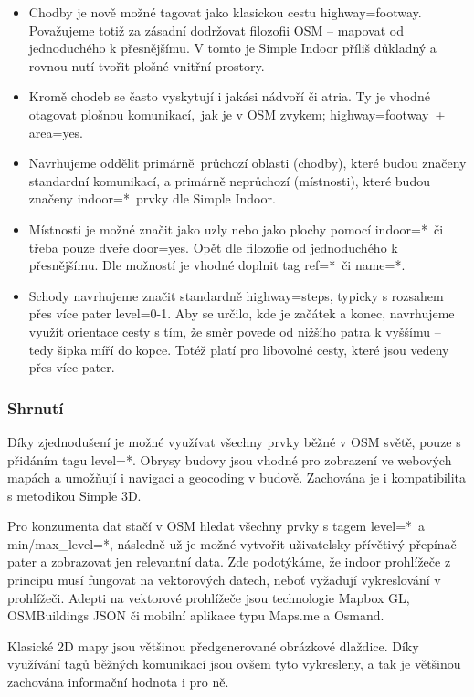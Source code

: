 \begin{itemize}
\tightlist
\item
  Chodby je nově možné tagovat jako klasickou cestu highway=footway. Považujeme totiž za zásadní dodržovat filozofii OSM -- mapovat od jednoduchého k přesnějšímu. V tomto je Simple Indoor příliš důkladný a rovnou nutí tvořit plošné vnitřní prostory.
\item
  Kromě chodeb se často vyskytují i jakási nádvoří či atria. Ty je vhodné otagovat plošnou komunikací,~jak je v OSM zvykem; highway=footway~+ area=yes.
\item
  Navrhujeme oddělit primárně~průchozí oblasti (chodby), které budou značeny standardní komunikací, a primárně neprůchozí (místnosti), které budou značeny indoor=*~prvky dle Simple Indoor.
\item
  Místnosti je možné značit jako uzly nebo jako plochy pomocí indoor=*~či třeba pouze dveře door=yes. Opět dle filozofie od jednoduchého k přesnějšímu. Dle možností je vhodné doplnit tag ref=*~či name=*.
\item
  Schody navrhujeme značit standardně highway=steps, typicky s rozsahem přes více pater level=0-1. Aby se určilo, kde je začátek a konec, navrhujeme využít orientace cesty s tím, že směr povede od nižšího patra k vyššímu -- tedy šipka míří do kopce. Totéž platí pro libovolné cesty, které jsou vedeny přes více pater.
\end{itemize}

\subsubsection{Shrnutí}\label{shrnutuxed}

Díky zjednodušení je možné využívat všechny prvky běžné v OSM světě, pouze s přidáním tagu level=*. Obrysy budovy jsou vhodné pro zobrazení ve webových mapách a umožňují i navigaci a geocoding v budově. Zachována je i kompatibilita s metodikou Simple 3D.

Pro konzumenta dat stačí v OSM hledat všechny prvky s tagem level=*~a min/max\_level=*, následně už je možné vytvořit uživatelsky přívětivý přepínač pater a zobrazovat jen relevantní data. Zde podotýkáme, že indoor prohlížeče z principu musí fungovat na vektorových datech, neboť vyžadují vykreslování v prohlížeči. Adepti na vektorové prohlížeče jsou technologie Mapbox GL, OSMBuildings JSON či mobilní aplikace typu Maps.me a Osmand.

Klasické 2D mapy jsou většinou předgenerované obrázkové dlaždice. Díky využívání tagů běžných komunikací jsou ovšem tyto vykresleny, a tak je většinou zachována informační hodnota i pro ně.

